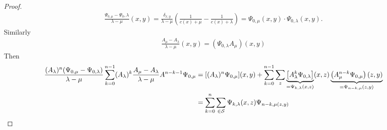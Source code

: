 \begin{proof}
    \begin{align*}
        \frac{\Psi_{0,\mu}-\Psi_0,\lambda}{\lambda-\mu}(x,y)=\frac{\delta_{x,y}}{\lambda-\mu}\left(\frac{1}{c(x)+\mu}-\frac{1}{c(x)+\lambda}\right)=\Psi_{0,\mu}(x,y)\cdot \Psi_{0,\lambda}(x,y).
    \end{align*}
    Similarly
    \begin{align*}
        \frac{A_\mu-A_\lambda}{\lambda-\mu}(x,y)=\left(\Psi_{0,\lambda}A_\mu\right)(x,y)
    \end{align*}
    Then 
    \begin{align*}
        \frac{(A_\lambda)^n (\Psi_{0,\mu}-\Psi_{0,\lambda})}{\lambda-\mu}\sum_{k=0}^{n-1} (A_\lambda)^k\frac{A_\mu-A_\lambda}{\lambda-\mu}A^{n-k-1}\Psi_{0,\mu} &= [(A_\lambda)^n\Psi_{0,\mu}](x,y)+\sum_{k=0}^{n-1}\sum_{z}\underbrace{\left[A_\lambda^k\Psi_{0,\lambda}\right]}_{=\Psi_{k,\lambda}(x,z)}(x,z)\underbrace{\left(A_\mu^{n-k}\Psi_{0,\mu}\right)(z,y)}_{=\Psi_{n-k,\mu}(z,y)}\\
        &=\sum_{k=0}^n \sum_{\in\mathcal{S}} \Psi_{k,\lambda}(x,z)\Psi_{n-k,\mu(z,y)}\qedhere
    \end{align*}

\end{proof}